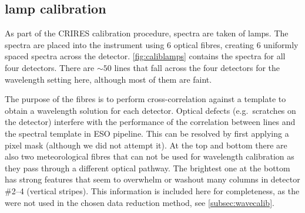 \subsection{\thar{} lamp calibration}
\label{subsec:th-ar}
As part of the {CRIRES} calibration procedure, spectra are taken of \thar{} lamps.
The \thar{} spectra are placed into the instrument using 6 optical fibres, creating 6 uniformly spaced spectra across the detector.
\cref{fig:caliblamps} contains the \thar{} spectra for all four detectors.
There are \(\sim50\) \thar{} lines that fall across the four detectors for the wavelength setting here, although most of them are faint.

The purpose of the \thar{} fibres is to perform cross-correlation against a \thar{} template to obtain a wavelength solution for each detector.
Optical defects (e.g.\ scratches on the detector) interfere with the performance of the correlation between \thar{} lines and the spectral template in {ESO} pipeline.
This can be resolved by first applying a pixel mask (although we did not attempt it).
At the top and bottom there are also two meteorological fibres that can not be used for wavelength calibration as they pass through a different optical pathway.
The brightest one at the bottom has strong features that seem to overwhelm or washout many columns in detector \#2--4 (vertical stripes). 
This information is included here for completeness, as the \thar{} were not used in the chosen data reduction method, see \cref{subsec:wavecalib}.


